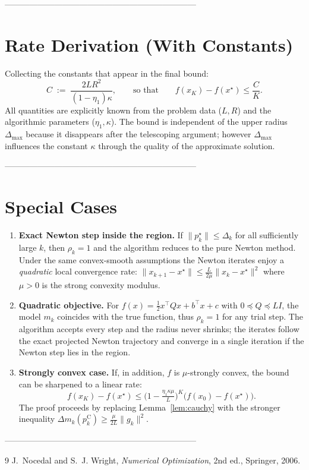 \documentclass{article}
\begin{document}
---------------------------------------------------------------------

\section*{Rate Derivation (With Constants)}
Collecting the constants that appear in the final bound:
\[
C \;:=\; \frac{2L R^2}{(1-\eta_1)\kappa},
\qquad
\text{so that}\qquad
f(x_K)-f(x^{\star})\le \frac{C}{K}.
\]
All quantities are explicitly known from the problem data (\(L,R\)) and the
algorithmic parameters (\(\eta_1,\kappa\)).  The bound is independent of the
upper radius \(\Delta_{\max}\) because it disappears after the telescoping
argument; however \(\Delta_{\max}\) influences the constant \(\kappa\) through the
quality of the approximate solution.

---------------------------------------------------------------------

\section*{Special Cases}
\begin{enumerate}
  \item \textbf{Exact Newton step inside the region.}
        If \(\|p_k^{\star}\|\le\Delta_k\) for all sufficiently large \(k\),
        then \(\rho_k=1\) and the algorithm reduces to the pure Newton method.
        Under the same convex‑smooth assumptions the Newton iterates enjoy a
        \emph{quadratic} local convergence rate:
        \(\|x_{k+1}-x^{\star}\|\le \frac{L}{2\mu}\|x_k-x^{\star}\|^2\) where
        \(\mu>0\) is the strong convexity modulus.

  \item \textbf{Quadratic objective.}
        For \(f(x)=\frac12 x^{\top}Qx+b^{\top}x+c\) with \(0\preceq Q\preceq L I\),
        the model \(m_k\) coincides with the true function, thus \(\rho_k=1\) for
        any trial step.  The algorithm accepts every step and the radius never
        shrinks; the iterates follow the exact projected Newton trajectory and
        converge in a single iteration if the Newton step lies in the region.

  \item \textbf{Strongly convex case.}
        If, in addition, \(f\) is \(\mu\)-strongly convex, the bound can be
        sharpened to a linear rate:
        \[
        f(x_K)-f(x^{\star})\le
        \bigl(1-\tfrac{\eta_1\kappa\mu}{L}\bigr)^K\bigl(f(x_0)-f(x^{\star})\bigr).
        \]
        The proof proceeds by replacing Lemma~\ref{lem:cauchy} with the
        stronger inequality \(\Delta m_k(p_k^{\text{C}})\ge
        \frac{\mu}{2L}\|g_k\|^2\).
\end{enumerate}

---------------------------------------------------------------------

\begin{thebibliography}{9}
J.~Nocedal and S.~J. Wright,
\textit{Numerical Optimization}, 2nd ed., Springer, 2006.
\end{thebibliography}
\end{document}
